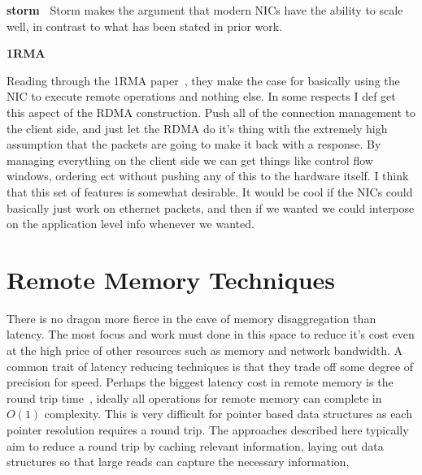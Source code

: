 


\textbf{storm~\cite{storm}} Storm makes the argument that modern NICs have the
ability to scale well, in contrast to what has been stated in prior work.

\textbf{1RMA~\cite{1rma}}

Reading through the 1RMA paper~\cite{1rma}, they make the case for basically
using the NIC to execute remote operations and nothing else. In some respects I
def get this aspect of the RDMA construction. Push all of the connection
management to the client side, and just let the RDMA do it's thing with the
extremely high assumption that the packets are going to make it back with a
response. By managing everything on the client side we can get things like
control flow windows, ordering ect without pushing any of this to the hardware
itself. I think that this set of features is somewhat desirable. It would be
cool if the NICs could basically just work on ethernet packets, and then if we
wanted we could interpose on the application level info whenever we wanted.


\section{Remote Memory Techniques}
\label{sec:techniques}

There is no dragon more fierce in the cave of memory disaggregation than
latency. The most focus and work must done in this space to reduce it's cost
even at the high price of other resources such as memory and network bandwidth.
A common trait of latency reducing techniques is that they trade off some degree
of precision for speed. Perhaps the biggest latency cost in remote memory is the
round trip time~\cite{design-far-memory-struct}, ideally all operations for
remote memory can complete in $O(1)$ complexity. This is very difficult for
pointer based data structures as each pointer resolution requires a round trip.
The approaches described here typically aim to reduce a round trip by caching
relevant information, laying out data structures so that large reads can capture
the necessary information, 


